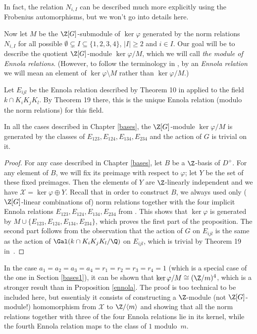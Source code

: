 \begin{rem}
In fact, the relation $N_{i,I}$ can be described much more explicitly using the Frobenius automorphisms, but we won't go into details here.
\end{rem}

Now let $M$ be the $\Z[G]$-submodule of $\ker \varphi$ generated by the norm relations $N_{i,I}$ for all possible $\emptyset\subsetneq I \subseteq \{1,2,3,4\}$, $|I|\geq 2$ and $i\in I$. Our goal will be to describe the quotient $\Z[G]$-module $\ker\varphi/M$, which we will call \textit{the module of Ennola relations}. (However, to follow the terminology in \citep{Kucera2016}, by an \textit{Ennola relation} we will mean an element of $\ker\varphi\setminus M$ rather than $\ker\varphi/M$.)

Let $E_{ijl}$ be the Ennola relation described by Theorem 10 in \citep{Kucera2016} applied to the field $k\cap K_iK_jK_l$. By Theorem 19 there, this is the unique Ennola relation (modulo the norm relations) for this field.
\begin{prop}\label{ennola}
In all the cases described in Chapter \ref{bases}, the $\Z[G]$-module $\ker\varphi/M$ is generated by the classes of $E_{123},E_{124},E_{134},E_{234}$ and the action of $G$ is trivial on it.
\end{prop}

\begin{proof}
For any case described in Chapter \ref{bases}, let $B$ be a $\Z$-basis of $D^+$. For any element of $B$, we will fix its preimage with respect to $\varphi$; let $Y$ be the set of these fixed preimages. Then the elements of $Y$ are $\Z$-linearly independent and we have $\mathcal{X}=\ker\varphi\oplus Y$. Recall that in order to construct $B$, we always used only ($\Z[G]$-linear combinations of) norm relations together with the four implicit Ennola relations $E_{123},E_{124},E_{134},E_{234}$ from \citep{Kucera2016}. This shows that $\ker \varphi$ is generated by $M\cup\{E_{123},E_{124},E_{134},E_{234}\}$, which proves the first part of the proposition. The second part follows from the observation that the action of $G$ on $E_{ijl}$ is the same as the action of $\Gal(k\cap K_iK_jK_l/\Q)$ on $E_{ijl}$, which is trivial by Theorem 19 in~\citep{Kucera2016}.
\end{proof}

\begin{rem}
In the case $a_1=a_2=a_3=a_4=r_1=r_2=r_3=r_4=1$ (which is a special case of the one in Section \ref{bases1}), it can be shown that $\ker \varphi/M \cong (\Z/m)^4$, which is a stronger result than in Proposition \ref{ennola}. The proof is too technical to be included here, but essentialy it consists of constructing a $\Z$-module (not $\Z[G]$-module!) homomorphism from $\mathcal{X}$ to $\Z/\langle m\rangle$ and showing that all the norm relations together with three of the four Ennola relations lie in its kernel, while the fourth Ennola relation maps to the class of $1$ modulo~$m$.
\end{rem}

